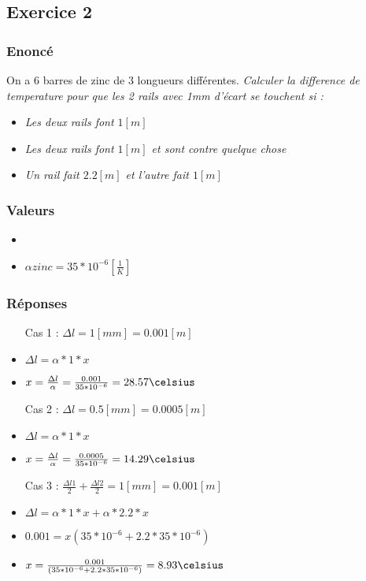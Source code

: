 
\subsection{Exercice 2}
\subsubsection{Enoncé}
On a 6 barres de zinc de 3 longueurs différentes.
\textit{Calculer la difference de temperature pour que les 2 rails avec 1mm d'écart se touchent si :}
\begin{itemize}
    \item \textit{Les deux rails font $1[m]$}
    \item \textit{Les deux rails font $1[m]$ et sont contre quelque chose}
    \item \textit{Un rail fait $2.2[m]$ et l'autre fait $1[m]$}
    
\end{itemize}

\subsubsection{Valeurs}
\begin{itemize}
    \item
    \item ${\alpha}zinc = 35*10^{-6} [\frac{1}{K}]$
\end{itemize}

\subsubsection{Réponses}
\begin{itemize} 
    \item[Cas 1 : ] ${\Delta}l = 1[mm] = 0.001[m]$
    \item ${\Delta}l = \alpha * 1 * x$
    \item $x = \frac{{\Delta}l}{\alpha} = \frac{0.001}{35*10^{-6}} = 28.57\celsius$
    \item[Cas 2 : ] ${\Delta}l = 0.5[mm] = 0.0005[m]$
    \item ${\Delta}l = \alpha * 1 * x$
    \item $x = \frac{{\Delta}l}{\alpha} = \frac{0.0005}{35*10^{-6}} = 14.29\celsius$
    \item[Cas 3 : ] $\frac{{\Delta}l1}{2} + \frac{{\Delta}l2}{2} = 1[mm] = 0.001[m]$
    \item ${\Delta}l = \alpha * 1 * x + \alpha * 2.2 * x$
    \item $0.001 = x(35*10^{-6} + 2.2*35*10^{-6})$
    \item $x = \frac{0.001}{(35*10^{-6} + 2.2*35*10^{-6})} = 8.93\celsius$
\end{itemize}
